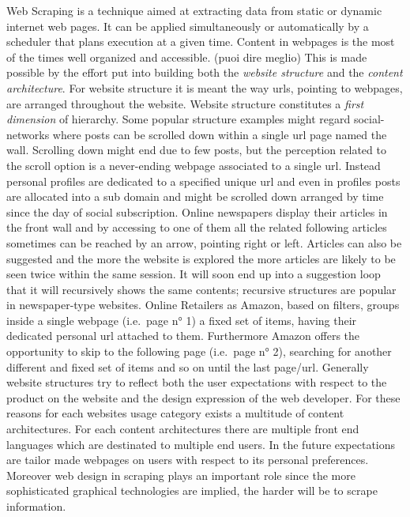 \documentclass[
  12pt,
  a4paper,
  oneside]{book}
\begin{document}
Web Scraping is a technique aimed at extracting data from static or dynamic internet web pages. It can be applied simultaneously or automatically by a scheduler that plans execution at a given time. Content in webpages is the most of the times well organized and accessible.
(puoi dire meglio)
This is made possible by the effort put into building both the \emph{website structure} and the \emph{content architecture}. For website structure it is meant the way urls, pointing to webpages, are arranged throughout the website.
Website structure constitutes a \emph{first dimension} of hierarchy. Some popular structure examples might regard social-networks where posts can be scrolled down within a single url page named the wall. Scrolling down might end due to few posts, but the perception related to the scroll option is a never-ending webpage associated to a single url. Instead personal profiles are dedicated to a specified unique url and even in profiles posts are allocated into a sub domain and might be scrolled down arranged by time since the day of social subscription. Online newspapers display their articles in the front wall and by accessing to one of them all the related following articles sometimes can be reached by an arrow, pointing right or left. Articles can also be suggested and the more the website is explored the more articles are likely to be seen twice within the same session. It will soon end up into a suggestion loop that it will recursively shows the same contents; recursive structures are popular in newspaper-type websites. Online Retailers as Amazon, based on filters, groups inside a single webpage (i.e.~page n° 1) a fixed set of items, having their dedicated personal url attached to them. Furthermore Amazon offers the opportunity to skip to the following page (i.e.~page n° 2), searching for another different and fixed set of items and so on until the last page/url. Generally website structures try to reflect both the user expectations with respect to the product on the website and the design expression of the web developer. For these reasons for each websites usage category exists a multitude of content architectures. For each content architectures there are multiple front end languages which are destinated to multiple end users. In the future expectations are tailor made webpages on users with respect to its personal preferences. Moreover web design in scraping plays an important role since the more sophisticated graphical technologies are implied, the harder will be to scrape information.
\end{document}

